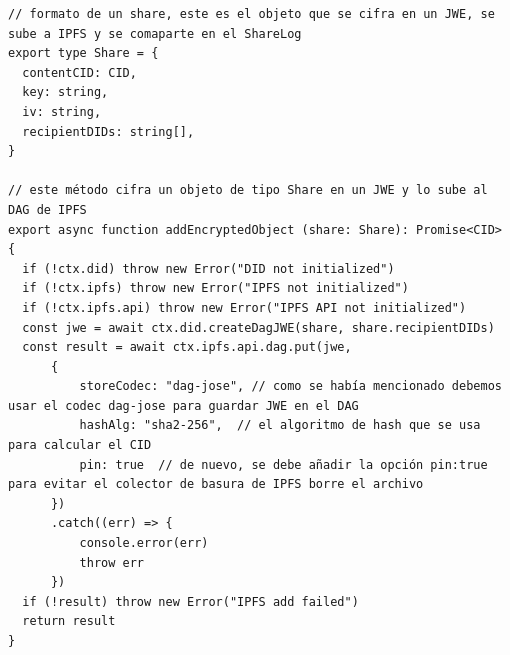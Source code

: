 \begin{verbatim}
// formato de un share, este es el objeto que se cifra en un JWE, se sube a IPFS y se comaparte en el ShareLog
export type Share = {
  contentCID: CID,
  key: string,
  iv: string,
  recipientDIDs: string[],
}

// este método cifra un objeto de tipo Share en un JWE y lo sube al DAG de IPFS
export async function addEncryptedObject (share: Share): Promise<CID> {
  if (!ctx.did) throw new Error("DID not initialized")
  if (!ctx.ipfs) throw new Error("IPFS not initialized")
  if (!ctx.ipfs.api) throw new Error("IPFS API not initialized")
  const jwe = await ctx.did.createDagJWE(share, share.recipientDIDs)
  const result = await ctx.ipfs.api.dag.put(jwe, 
      {
          storeCodec: "dag-jose", // como se había mencionado debemos usar el codec dag-jose para guardar JWE en el DAG
          hashAlg: "sha2-256",  // el algoritmo de hash que se usa para calcular el CID
          pin: true  // de nuevo, se debe añadir la opción pin:true para evitar el colector de basura de IPFS borre el archivo
      })
      .catch((err) => {
          console.error(err)
          throw err
      })
  if (!result) throw new Error("IPFS add failed")
  return result
}
\end{verbatim}